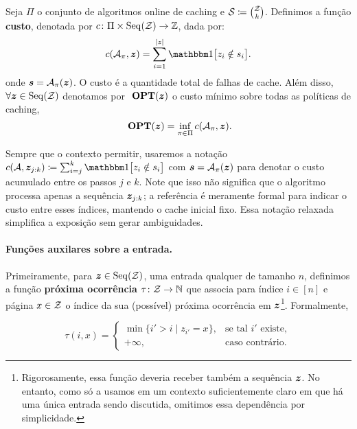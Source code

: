 \begin{definition}[Custo]
  Seja \(\Pi\) o conjunto de algoritmos online de caching e \(\mathcal{S} \coloneq \binom{\mathcal{Z}}{k}\). Definimos a função \textbf{custo}, denotada por \(c \colon \Pi \times \operatorname{Seq}(\mathcal{Z}) \to \mathbb{Z}\), dada por:
  \begin{equation}
    c(\Acal_\pi, \boldz) = \sum_{i=1}^{|z|} \ind{z_i \notin s_i}.
  \end{equation}
  onde \(\bm{s} = \mathcal{A}_\pi(\bm{z})\). O custo é a quantidade total de falhas de cache. Além disso, \(\forall \bm{z} \in \operatorname{Seq}(\mathcal{Z})\) denotamos por \(\ \textbf{OPT}(\bm{z})\) o custo mínimo sobre todas as políticas de caching,
  \begin{equation}
    \ \textbf{OPT}(\bm{z}) = \inf_{\pi \in \Pi} c(\mathcal{A}_\pi, \bm{z}).
  \end{equation}
\end{definition}

Sempre que o contexto permitir, usaremos a notação \(c(\Acal, \boldz_{j:k}) \coloneqq \sum_{i=j}^{k} \ind{z_i \notin s_i}\) com \(\bm{s} = \mathcal{A}_\pi(\bm{z})\) para denotar o custo acumulado entre os passos \(j\) e \(k\). Note que isso não significa que o algoritmo processa apenas a sequência \(\bm{z}_{j:k}\); a referência é meramente formal para indicar o custo entre esses índices, mantendo o cache inicial fixo. Essa notação relaxada simplifica a exposição sem gerar ambiguidades.

\paragraph*{Funções auxilares sobre a entrada.}Primeiramente, para \(\bm{z} \in \operatorname{Seq}(\mathcal{Z})\), uma entrada qualquer de tamanho \(n\), definimos a função \textbf{próxima ocorrência} \(\tau \colon \mathcal{Z} \to \mathbb{N}\) que associa para índice \(i \in [n]\) e página \(x \in \mathcal{Z}\) o índice da sua (possível) próxima ocorrência em \(\bm{z}\)\footnote{Rigorosamente, essa função deveria receber também a sequência \(\bm{z}\). No entanto, como só a usamos em um contexto suficientemente claro em que há uma única entrada sendo discutida, omitimos essa dependência por simplicidade.}. Formalmente,

\begin{equation*}
\tau(i, x) =
\begin{cases}
  \min \{ i' > i \mid z_{i'} = x \}, & \text{se tal } i' \text{ existe}, \\
  +\infty, & \text{caso contrário}.
\end{cases}
\end{equation*}

